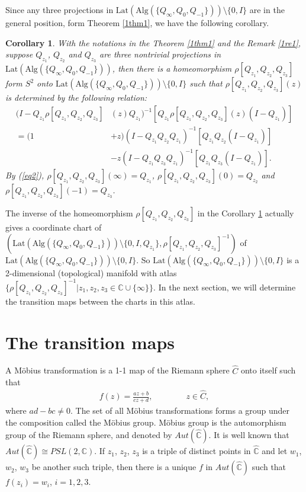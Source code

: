 \documentclass{amsart}
\newcommand{\Lat}{\mathrm{Lat}}
\newcommand{\Alg}{\mathrm{Alg}}
\newcommand{\C}{\mathbb C} %
\newtheorem{corollary}{Corollary}[section]
\begin{document}
Since any three projections in $\Lat(\Alg(\{Q_{\infty}, Q_{0}, Q_{-1}\})) \setminus \{0, I\}$ are in the general position, form Theorem \ref{1thm1}, we have the following corollary.
\begin{corollary}\label{1cor1}
With the notations in the Theorem \ref{1thm1} and the Remark \ref{1re1}, suppose $Q_{z_1}$, $Q_{z_2}$ and $Q_{z_3}$ are three nontrivial projections in $\Lat(\Alg(\{Q_{\infty}, Q_{0}, Q_{-1}\}))$,
then there is a homeomorphism $\rho[Q_{z_1}, Q_{z_2}, Q_{z_3}]$ form $S^2$ onto $\Lat(\Alg(\{Q_{\infty}, Q_{0}, Q_{-1}\})) \setminus \{0, I\}$ such that $\rho[Q_{z_1}, Q_{z_2}, Q_{z_3}](z)$ is determined by the following relation:
\begin{equation}\label{eq2}
\begin{split}
(I - Q_{z_1}\rho[Q_{z_1}, Q_{z_2}, Q_{z_3}]&(z)Q_{z_1})^{-1}[Q_{z_1}\rho[Q_{z_1}, Q_{z_2}, Q_{z_3}](z)(I-Q_{z_1})]\\
=(1 &+z)(I - Q_{z_1}Q_{z_2}Q_{z_1})^{-1}[Q_{z_1}Q_{z_2}(I-Q_{z_1})] \\
 & - z(I - Q_{z_1}Q_{z_3}Q_{z_1})^{-1}[Q_{z_1}Q_{z_3}(I-Q_{z_1})].
 \end{split}
\end{equation}
By (\ref{eq2}), $\rho[Q_{z_1}, Q_{z_2}, Q_{z_3}](\infty) = Q_{z_1}$, $\rho[Q_{z_1}, Q_{z_2}, Q_{z_3}](0) = Q_{z_2}$ and $\rho[Q_{z_1}, Q_{z_2}, Q_{z_3}](-1) = Q_{z_3}$. 
\end{corollary}
  

The inverse of the homeomorphism $\rho[Q_{z_1}, Q_{z_2}, Q_{z_3}]$ in the Corollary \ref{1cor1} actually gives a coordinate chart of  $(\Lat(\Alg(\{Q_{\infty}, Q_{0}, Q_{-1}\})) \setminus \{0, I,  Q_{z_1}\}, 
\rho[Q_{z_1}, Q_{z_2}, Q_{z_3}]^{-1})$ of $\Lat(\Alg(\{Q_{\infty}, Q_{0}, Q_{-1}\})) \setminus \{0, I \}$.
So $\Lat(\Alg(\{Q_{\infty}, Q_{0}, Q_{-1}\})) \setminus \{0, I\}$ is a 2-dimensional (topological) manifold with atlas
$\{\rho[Q_{z_1}, Q_{z_2}, Q_{z_3}]^{-1} | z_1, z_2, z_3 \in \C \cup \{\infty \} \}$. In the next section, we will determine the transition maps between the charts in this atlas.



\section{The transition maps}
A M\"{o}bius transformation is a 1-1 map of the Riemann sphere $\widehat{C}$ onto itself such that 
\begin{align*}
f(z) = \frac{az + b}{cz + d},   \qquad \qquad z \in \widehat{C},
\end{align*}
where $ad - bc \neq 0$. 
The set of all M\"{o}bius transformations forms a group under the composition called the M\"{o}bius group.
M\"{o}bius group is the automorphism group of the Riemann sphere, and denoted by $Aut(\widehat{\C})$.
It is well known that $Aut(\widehat{\C}) \cong PSL(2, \C)$. If $z_1$, $z_2$, $z_3$ is a triple of distinct points in $\widehat{\C}$ and 
let $w_1$, $w_2$, $w_3$ be another such triple, then there is a unique $f$ in $Aut(\widehat{\C})$ such that $f(z_i) = w_i$, $i = 1, 2,3$.
 
\end{document}
